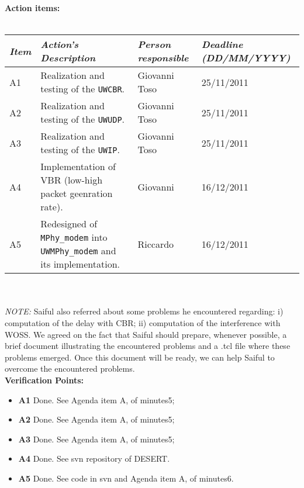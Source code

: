 \documentclass[11pt,journal,draftclsnofoot,onecolumn,twoside,letterpaper]{IEEEtran}
\theoremstyle{definition} \newtheorem{definition}[]{Definition}
\theoremstyle{theorem} \newtheorem{theorem}[]{Theorem}
\begin{document}
{\bf Action items:}\\
\ \\
\begin{tabular}{|p{}|p{}|p{}|p{}|}
\hline
{\it Item} & {\it Action's Description} & {\it Person responsible} & {\it Deadline (DD/MM/YYYY)}\\
\hline
A1 & Realization and testing of the {\tt UWCBR}. & Giovanni Toso & 25/11/2011\\ 
A2 & Realization and testing of the {\tt UWUDP}. & Giovanni Toso & 25/11/2011\\ 
A3 & Realization and testing of the {\tt UWIP}. & Giovanni Toso & 25/11/2011\\
A4 & Implementation of VBR (low-high packet geenration rate). & Giovanni & 16/12/2011\\
A5 & Redesigned of {\tt MPhy\_modem} into {\tt UWMPhy\_modem} and its implementation. & Riccardo & 16/12/2011\\
\hline
\end{tabular}
\ \\
\ \\
{\it NOTE:} Saiful also referred about some problems he encountered regarding: i) computation of the delay with CBR; ii) computation of the interference with WOSS. We agreed on the fact that Saiful should prepare, whenever possible, a brief document illustrating the encountered problems and a .tcl file where these problems emerged. Once this document will be ready, we can help Saiful to overcome the encountered problems.
\ \\
{\bf Verification Points:}
\begin{itemize}
 \item {\bf A1} Done. See Agenda item A, of minutes5;
 \item {\bf A2} Done. See Agenda item A, of minutes5;
 \item {\bf A3} Done. See Agenda item A, of minutes5;
 \item {\bf A4} Done. See svn repository of DESERT.
 \item {\bf A5} Done. See code in svn and Agenda item A, of minutes6.
\end{itemize}
\end{document}
